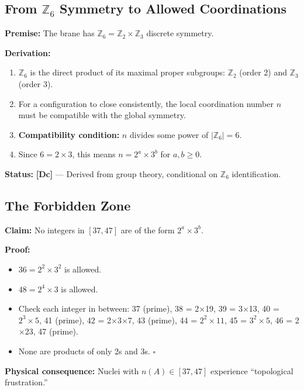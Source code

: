 \documentclass[11pt,a4paper]{article}
\newcommand{\tagDc}{\textcolor{blue!70!black}{\textbf{[Dc]}}}
\begin{document}
\subsection{From $\mathbb{Z}_6$ Symmetry to Allowed Coordinations}

\textbf{Premise:} The brane has $\mathbb{Z}_6 = \mathbb{Z}_2 \times \mathbb{Z}_3$ discrete symmetry.

\textbf{Derivation:}
\begin{enumerate}
    \item $\mathbb{Z}_6$ is the direct product of its maximal proper subgroups: $\mathbb{Z}_2$ (order 2) and $\mathbb{Z}_3$ (order 3).

    \item For a configuration to close consistently, the local coordination number $n$ must be compatible with the global symmetry.

    \item \textbf{Compatibility condition:} $n$ divides some power of $|\mathbb{Z}_6| = 6$.

    \item Since $6 = 2 \times 3$, this means $n = 2^a \times 3^b$ for $a, b \geq 0$.
\end{enumerate}

\textbf{Status:} \tagDc{} --- Derived from group theory, conditional on $\mathbb{Z}_6$ identification.

\subsection{The Forbidden Zone}

\textbf{Claim:} No integers in $[37, 47]$ are of the form $2^a \times 3^b$.

\textbf{Proof:}
\begin{itemize}[nosep]
    \item $36 = 2^2 \times 3^2$ is allowed.
    \item $48 = 2^4 \times 3$ is allowed.
    \item Check each integer in between: 37 (prime), 38 = 2$\times$19, 39 = 3$\times$13, 40 = $2^3 \times 5$, 41 (prime), 42 = 2$\times$3$\times$7, 43 (prime), 44 = $2^2 \times 11$, 45 = $3^2 \times 5$, 46 = 2$\times$23, 47 (prime).
    \item None are products of only 2s and 3s. $\square$
\end{itemize}

\textbf{Physical consequence:} Nuclei with $n(A) \in [37, 47]$ experience ``topological frustration.''
\end{document}
